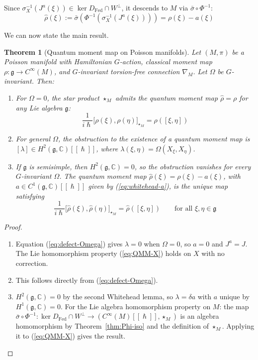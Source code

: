 \documentclass[
  12pt,
  a4paper, oneside
]{report}
\renewcommand{\hbar}{\hslash}
\theoremstyle{bolddef}
\newtheorem{theorem}{Theorem}[chapter]
\theoremstyle{remark}
\numberwithin{equation}{chapter}
\begin{document}
Since $\sigma_X^{-1}(J^a(\xi)) \in \ker D_{\mathrm{Fed}} \cap W^\perp$, it descends to $M$ via $\bar{\sigma} \circ \Phi^{-1}$:
\begin{equation}\label{eq:qmm-M}
\hat{\rho}(\xi) := \bar{\sigma}\!\left(\Phi^{-1}(\sigma_X^{-1}(J^a(\xi)))\right) = \rho(\xi) - a(\xi)
\end{equation}

We can now state the main result.

\begin{theorem}[Quantum moment map on Poisson manifolds]\label{thm:QMM}
Let $(M, \pi)$ be a Poisson manifold with Hamiltonian $G$-action, classical moment map $\rho : \mathfrak{g} \to C^\infty(M)$, and $G$-invariant torsion-free connection $\nabla_M$. Let $\Omega$ be $G$-invariant. Then:
\begin{enumerate}
\item For $\Omega = 0$, the star product $\star_M$ admits the quantum moment map $\hat{\rho} = \rho$ for any Lie algebra $\mathfrak{g}$:
\[
\frac{1}{i\hbar}\big[\rho(\xi), \rho(\eta)\big]_{\star_M} = \rho([\xi, \eta])
\]
\item For general $\Omega$, the obstruction to the existence of a quantum moment map is $[\lambda] \in H^2(\mathfrak{g}, \mathbb{C})[[\hbar]]$, where $\lambda(\xi, \eta) = \Omega(X_\xi, X_\eta)$.
\item If $\mathfrak{g}$ is semisimple, then $H^2(\mathfrak{g}, \mathbb{C}) = 0$, so the obstruction vanishes for every $G$-invariant $\Omega$. The quantum moment map $\hat{\rho}(\xi) = \rho(\xi) - a(\xi)$, with $a \in C^1(\mathfrak{g}, \mathbb{C})[[\hbar]]$ given by (\ref{eq:whitehead-a}), is the unique map satisfying
\[
\frac{1}{i\hbar}\big[\hat{\rho}(\xi), \hat{\rho}(\eta)\big]_{\star_M} = \hat{\rho}([\xi, \eta]) \qquad \text{for all } \xi, \eta \in \mathfrak{g}
\]
\end{enumerate}
\end{theorem}
\begin{proof}
\begin{enumerate}
\item Equation (\ref{eq:defect-Omega}) gives $\lambda = 0$ when $\Omega = 0$, so $a = 0$ and $J^a = J$. The Lie homomorphism property (\ref{eq:QMM-X}) holds on $X$ with no correction.
\item This follows directly from (\ref{eq:defect-Omega}).
\item $H^2(\mathfrak{g}, \mathbb{C}) = 0$ by the second Whitehead lemma, so $\lambda = \delta a$ with $a$ unique by $H^1(\mathfrak{g}, \mathbb{C}) = 0$.
For the Lie algebra homomorphism property on $M$: the map $\bar{\sigma} \circ \Phi^{-1} : \ker D_{\mathrm{Fed}} \cap W^\perp \to (C^\infty(M)[[\hbar]], \star_M)$ is an algebra homomorphism by Theorem~\ref{thm:Phi-iso} and the definition of $\star_M$. Applying it to (\ref{eq:QMM-X}) gives the result. \qedhere
\end{enumerate}
\end{proof}
\end{document}
